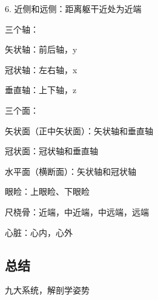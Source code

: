 6. 近侧和远侧：距离躯干近处为近端
\begin{notation}
    三个轴：

    矢状轴：前后轴，y

    冠状轴：左右轴，x

    垂直轴：上下轴，z

    三个面：

    矢状面（正中矢状面）：矢状轴和垂直轴

    冠状面：冠状轴和垂直轴

    水平面（横断面）：矢状轴和冠状轴
\end{notation}
\begin{eg}
    眼睑：上眼睑、下眼睑

    尺桡骨：近端，中近端，中远端，远端

    心脏：心内，心外
\end{eg}
\subsection{总结}%
\label{sub:总结}
九大系统，解剖学姿势
